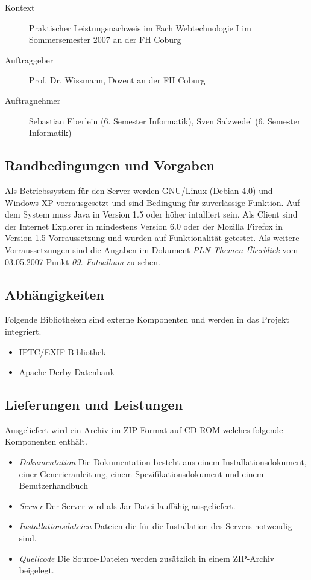 \documentclass[a4paper,12pt,liststotocnumbered]{scrartcl}
\begin{document}
\begin{description}
	\item[Kontext] Praktischer Leistungsnachweis im Fach Webtechnologie I
		im Sommersemester 2007 an der FH Coburg
	\item[Auftraggeber] Prof. Dr. Wissmann, Dozent an der FH Coburg
	\item[Auftragnehmer] Sebastian Eberlein (6. Semester Informatik), Sven
		Salzwedel (6. Semester Informatik)
\end{description}

\subsection{Randbedingungen und Vorgaben}

Als Betriebssystem für den Server werden GNU/Linux (Debian 4.0) und Windows XP
vorrausgesetzt und sind Bedingung für zuverlässige Funktion. Auf dem System
muss Java in Version 1.5 oder höher intalliert sein. Als Client sind der
Internet Explorer in mindestens Version 6.0 oder der Mozilla Firefox in
Version 1.5 Vorraussetzung und wurden auf Funktionalität getestet. Als weitere
Vorraussetzungen sind die Angaben im Dokument \textit{PLN-Themen Überblick}
vom 03.05.2007 Punkt \textit{09. Fotoalbum} zu sehen.

\subsection{Abhängigkeiten}

Folgende Bibliotheken sind externe Komponenten und werden in das Projekt
integriert.

\begin{itemize}
	\item IPTC/EXIF Bibliothek
	\item Apache Derby Datenbank
\end{itemize}

\subsection{Lieferungen und Leistungen}

Ausgeliefert wird ein Archiv im ZIP-Format auf CD-ROM welches folgende
Komponenten enthält.

\begin{itemize}

	\item \textit{Dokumentation} Die Dokumentation besteht aus einem
		Installationsdokument, einer Generieranleitung, einem
		Spezifikationsdokument und einem Benutzerhandbuch

	\item \textit{Server} Der Server wird als Jar Datei lauffähig
		ausgeliefert.
	
	\item \textit{Installationsdateien} Dateien die für die Installation
		des Servers notwendig sind.

	\item \textit{Quellcode} Die Source-Dateien werden zusätzlich in einem
		ZIP-Archiv beigelegt.

\end{itemize}
\end{document}
